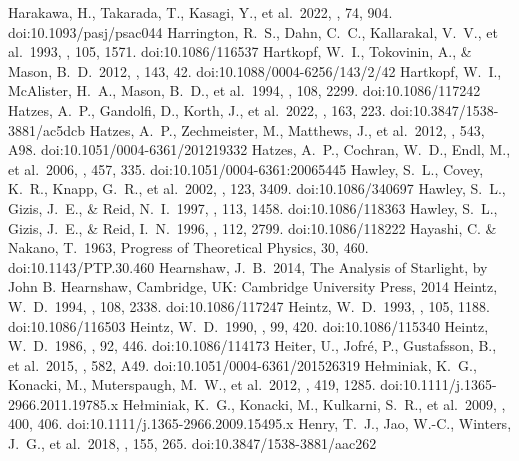 \documentclass[twocolumn,tighten,twocolappendix]{aastex631}
\begin{document}
\begin{thebibliography}{}
 Harakawa, H., Takarada, T., Kasagi, Y., et al.\ 2022, \pasj, 74, 904. doi:10.1093/pasj/psac044
 Harrington, R.~S., Dahn, C.~C., Kallarakal, V.~V., et al.\ 1993, \aj, 105, 1571. doi:10.1086/116537
 Hartkopf, W.~I., Tokovinin, A., \& Mason, B.~D.\ 2012, \aj, 143, 42. doi:10.1088/0004-6256/143/2/42
 Hartkopf, W.~I., McAlister, H.~A., Mason, B.~D., et al.\ 1994, \aj, 108, 2299. doi:10.1086/117242
 Hatzes, A.~P., Gandolfi, D., Korth, J., et al.\ 2022, \aj, 163, 223. doi:10.3847/1538-3881/ac5dcb
 Hatzes, A.~P., Zechmeister, M., Matthews, J., et al.\ 2012, \aap, 543, A98. doi:10.1051/0004-6361/201219332
 Hatzes, A.~P., Cochran, W.~D., Endl, M., et al.\ 2006, \aap, 457, 335. doi:10.1051/0004-6361:20065445
 Hawley, S.~L., Covey, K.~R., Knapp, G.~R., et al.\ 2002, \aj, 123, 3409. doi:10.1086/340697
 Hawley, S.~L., Gizis, J.~E., \& Reid, N.~I.\ 1997, \aj, 113, 1458. doi:10.1086/118363
 Hawley, S.~L., Gizis, J.~E., \& Reid, I.~N.\ 1996, \aj, 112, 2799. doi:10.1086/118222
 Hayashi, C. \& Nakano, T.\ 1963, Progress of Theoretical Physics, 30, 460. doi:10.1143/PTP.30.460
 Hearnshaw, J.~B.\ 2014, The Analysis of Starlight, by John B. Hearnshaw, Cambridge, UK: Cambridge University Press, 2014
 Heintz, W.~D.\ 1994, \aj, 108, 2338. doi:10.1086/117247
 Heintz, W.~D.\ 1993, \aj, 105, 1188. doi:10.1086/116503
 Heintz, W.~D.\ 1990, \aj, 99, 420. doi:10.1086/115340
 Heintz, W.~D.\ 1986, \aj, 92, 446. doi:10.1086/114173
 Heiter, U., Jofr{\'e}, P., Gustafsson, B., et al.\ 2015, \aap, 582, A49. doi:10.1051/0004-6361/201526319
 He{\l}miniak, K.~G., Konacki, M., Muterspaugh, M.~W., et al.\ 2012, \mnras, 419, 1285. doi:10.1111/j.1365-2966.2011.19785.x
 He{\l}miniak, K.~G., Konacki, M., Kulkarni, S.~R., et al.\ 2009, \mnras, 400, 406. doi:10.1111/j.1365-2966.2009.15495.x
 Henry, T.~J., Jao, W.-C., Winters, J.~G., et al.\ 2018, \aj, 155, 265. doi:10.3847/1538-3881/aac262

\end{thebibliography}
\end{document}
